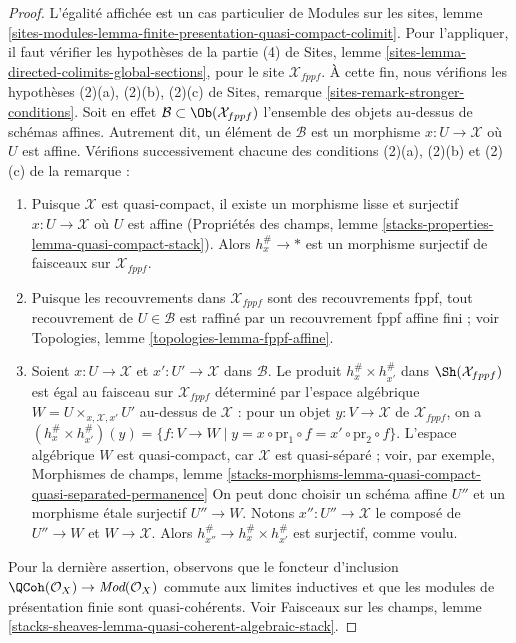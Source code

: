 \begin{proof}
L'égalité affichée est un cas particulier de Modules sur les sites, lemme
\ref{sites-modules-lemma-finite-presentation-quasi-compact-colimit}.
Pour l'appliquer, il faut vérifier les hypothèses de la partie (4) de
Sites, lemme \ref{sites-lemma-directed-colimits-global-sections},
pour le site $\mathcal{X}_{fppf}$. À cette fin, nous vérifions
les hypothèses (2)(a), (2)(b), (2)(c) de
Sites, remarque \ref{sites-remark-stronger-conditions}.
Soit en effet $\mathcal{B} \subset \Ob(\mathcal{X}_{fppf})$ l'ensemble
des objets au-dessus de schémas affines. Autrement dit, un élément
de $\mathcal{B}$ est un morphisme $x : U \to \mathcal{X}$ où $U$ est affine.
Vérifions successivement chacune des conditions (2)(a), (2)(b) et (2)(c)
de la remarque :
\begin{enumerate}
\item Puisque $\mathcal{X}$ est quasi-compact, il existe un morphisme
lisse et surjectif $x : U \to \mathcal{X}$ où $U$ est affine
(Propriétés des champs, lemme
\ref{stacks-properties-lemma-quasi-compact-stack}).
Alors $h_x^\# \to *$ est un morphisme surjectif de faisceaux sur $\mathcal{X}_{fppf}$.
\item Puisque les recouvrements dans $\mathcal{X}_{fppf}$ sont des recouvrements
fppf, tout recouvrement de $U \in \mathcal{B}$ est raffiné
par un recouvrement fppf affine fini ; voir
Topologies, lemme \ref{topologies-lemma-fppf-affine}.
\item Soient $x : U \to \mathcal{X}$ et $x' : U' \to \mathcal{X}$ dans
$\mathcal{B}$. Le produit $h_x^\# \times h_{x'}^\#$ dans
$\Sh(\mathcal{X}_{fppf})$ est égal au faisceau sur $\mathcal{X}_{fppf}$
déterminé par l'espace algébrique $W = U \times_{x, \mathcal{X}, x'} U'$ au-dessus de
$\mathcal{X}$ : pour un objet $y : V \to \mathcal{X}$ de
$\mathcal{X}_{fppf}$, on a
$(h_x^\# \times h_{x'}^\#)(y) = \{f : V \to W \mid y =
x \circ \text{pr}_1 \circ f = x' \circ \text{pr}_2 \circ f\}$.
L'espace algébrique $W$ est quasi-compact, car $\mathcal{X}$
est quasi-séparé ; voir, par exemple, Morphismes de champs, lemme
\ref{stacks-morphisms-lemma-quasi-compact-quasi-separated-permanence}
On peut donc choisir un schéma affine $U''$ et
un morphisme étale surjectif $U'' \to W$. Notons $x'' : U'' \to \mathcal{X}$
le composé de $U'' \to W$ et $W \to \mathcal{X}$. Alors
$h_{x''}^\# \to h_x^\# \times h_{x'}^\#$ est surjectif, comme voulu.
\end{enumerate}
Pour la dernière assertion, observons que le foncteur d'inclusion
$\QCoh(\mathcal{O}_X) \to \textit{Mod}(\mathcal{O}_X)$
commute aux limites inductives et que les modules de présentation finie
sont quasi-cohérents. Voir Faisceaux sur les champs, lemme
\ref{stacks-sheaves-lemma-quasi-coherent-algebraic-stack}.
\end{proof}



